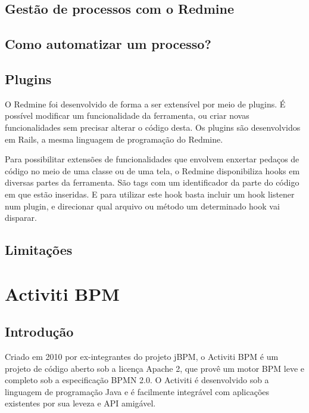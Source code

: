 \section{Gestão de processos com o Redmine}\label{sec:LABEL_CHP_3_SEC_B}


\section{Como automatizar um processo?}\label{sec:LABEL_CHP_3_SEC_C}

\section{Plugins}\label{sec:LABEL_CHP_3_SEC_D}
O Redmine foi desenvolvido de forma a ser extensível por meio de plugins. É possível modificar um funcionalidade da ferramenta, ou criar novas funcionalidades sem precisar alterar o código desta. Os plugins são desenvolvidos em Rails, a mesma linguagem de programação do Redmine. 

Para possibilitar extensões de funcionalidades que envolvem enxertar pedaços de código no meio de uma classe ou de uma tela, o Redmine disponibiliza hooks em diversas partes da ferramenta. São tags com um identificador da parte do código em que estão inseridas. E para utilizar este hook basta incluir um hook listener num plugin, e direcionar qual arquivo ou método um determinado hook vai disparar.

\section{Limitações}\label{sec:LABEL_CHP_3_SEC_E}


\chapter{Activiti BPM}\label{chp:LABEL_CHP_4}

\section{Introdução}\label{sec:LABEL_CHP_4_SEC_A}
Criado em 2010 por ex-integrantes do projeto jBPM, o Activiti BPM é um projeto de código aberto sob a licença Apache 2, que provê um motor BPM leve e completo sob a especificação BPMN 2.0. O Activiti é desenvolvido sob a linguagem de programação Java e é facilmente integrável com aplicações existentes por sua leveza e API amigável.

